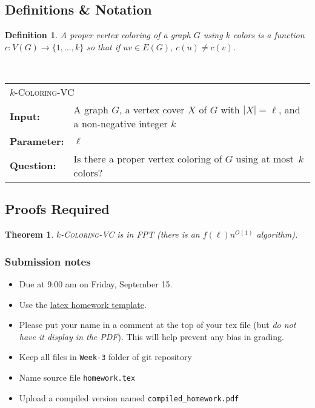 \documentclass{article}
\newcommand{\defproblem}[4]{%
  \hfill\\\smallskip\noindent%
  \begin{tabularx}{\textwidth}{|l X|}%
    \hline%
    \multicolumn{2}{|l|}{\pname{#1}}\\%
    \textbf{Input:}&#2\\%
    \textbf{Parameter:}&#3\\%
    \textbf{Question:}&#4\smallskip\\\hline%
  \end{tabularx}%
  \smallskip%
}%
\newcommand{\pname}[1]{\textnormal{\textsc{#1}}}
\newtheorem*{theorem}{Theorem}
\newtheorem{definition}{Definition}
\begin{document}
\subsection*{Definitions \& Notation}
\begin{definition}
    A \emph{proper vertex coloring} of a graph $G$ \emph{using $k$ colors}
    is a function $c: V(G) \rightarrow \{1,\ldots, k\}$ so that if $uv \in E(G)$,
    $c(u) \neq c(v)$.
\end{definition}


\defproblem{$k$-Coloring-VC}
%
{A graph $G$, a vertex cover $X$ of $G$ with $|X| = \ell$, and a non-negative integer $k$}
%
{$\ell$}
%
{Is there a proper vertex coloring of $G$ using at most~$k$ colors?}
%


\subsection*{Proofs Required}

\begin{theorem} $k$-\pname{Coloring-VC} is in FPT (there is an $f(\ell)n^{O(1)}$ algorithm).
\end{theorem}


\vfill

\subsubsection*{Submission notes}
\begin{itemize}
\item Due at 9:00 am on Friday, September 15.
\item Use the \href{https://github.com/bdsullivan/ParameterizedAlgorithms-Fall2017/tree/master/templates/homework}{latex homework template}.
\item Please put your name in a comment at the top of your tex file (but {\it do not
have it display in the PDF}). This will help prevent any bias in grading.
\item Keep all files in \texttt{Week-3} folder of git repository
\item Name source file \texttt{homework.tex}
\item Upload a compiled version named \texttt{compiled\_homework.pdf}
\end{itemize}
\end{document}
